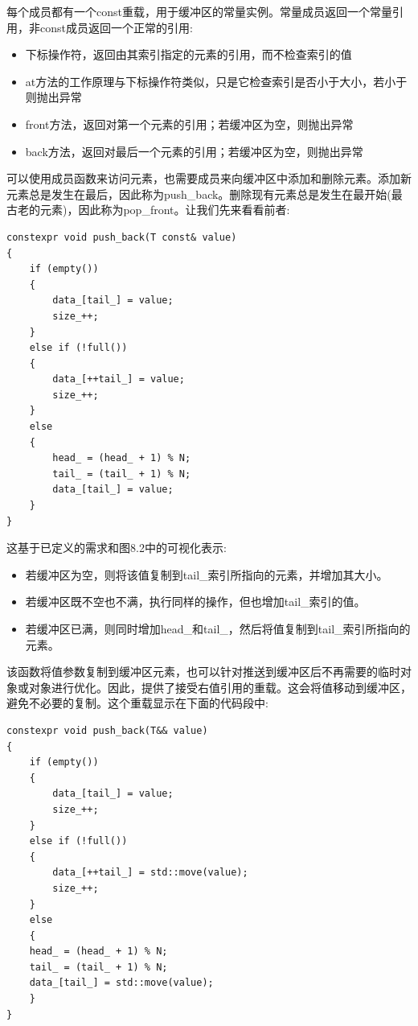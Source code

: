 每个成员都有一个const重载，用于缓冲区的常量实例。常量成员返回一个常量引用，非const成员返回一个正常的引用:

\begin{itemize}
\item
下标操作符，返回由其索引指定的元素的引用，而不检查索引的值

\item
at方法的工作原理与下标操作符类似，只是它检查索引是否小于大小，若小于则抛出异常

\item
front方法，返回对第一个元素的引用；若缓冲区为空，则抛出异常

\item
back方法，返回对最后一个元素的引用；若缓冲区为空，则抛出异常
\end{itemize}

可以使用成员函数来访问元素，也需要成员来向缓冲区中添加和删除元素。添加新元素总是发生在最后，因此称为push\_back。删除现有元素总是发生在最开始(最古老的元素)，因此称为pop\_front。让我们先来看看前者:

\begin{lstlisting}[style=styleCXX]
constexpr void push_back(T const& value)
{
	if (empty())
	{
		data_[tail_] = value;
		size_++;
	}
	else if (!full())
	{
		data_[++tail_] = value;
		size_++;
	}
	else
	{
		head_ = (head_ + 1) % N;
		tail_ = (tail_ + 1) % N;
		data_[tail_] = value;
	}
}
\end{lstlisting}

这基于已定义的需求和图8.2中的可视化表示:

\begin{itemize}
\item
若缓冲区为空，则将该值复制到tail\_索引所指向的元素，并增加其大小。

\item
若缓冲区既不空也不满，执行同样的操作，但也增加tail\_索引的值。

\item
若缓冲区已满，则同时增加head\_和tail\_，然后将值复制到tail\_索引所指向的元素。
\end{itemize}

该函数将值参数复制到缓冲区元素，也可以针对推送到缓冲区后不再需要的临时对象或对象进行优化。因此，提供了接受右值引用的重载。这会将值移动到缓冲区，避免不必要的复制。这个重载显示在下面的代码段中:

\begin{lstlisting}[style=styleCXX]
constexpr void push_back(T&& value)
{
	if (empty())
	{
		data_[tail_] = value;
		size_++;
	}
	else if (!full())
	{
		data_[++tail_] = std::move(value);
		size_++;
	}
	else
	{
	head_ = (head_ + 1) % N;
	tail_ = (tail_ + 1) % N;
	data_[tail_] = std::move(value);
	}
}
\end{lstlisting}

